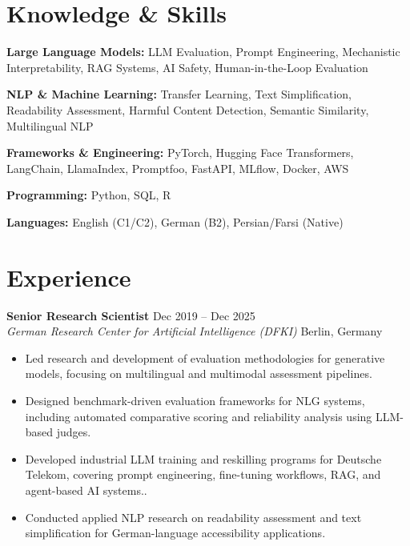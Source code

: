 \documentclass[11pt,a4paper]{article}
\newcommand{\cvitem}[1]{
    \item #1
}
\newcommand{\role}[4]{
    \textbf{#1} \hfill {\small #2} \\
    \textit{#3} \hfill {\small #4}
}
\begin{document}
\vspace{0.7em}

\section*{Knowledge \& Skills}

\textbf{Large Language Models:} 
LLM Evaluation, Prompt Engineering, Mechanistic Interpretability, RAG Systems, AI Safety, Human-in-the-Loop Evaluation

\textbf{NLP \& Machine Learning:} 
Transfer Learning, Text Simplification, Readability Assessment, Harmful Content Detection, Semantic Similarity, Multilingual NLP

\textbf{Frameworks \& Engineering:} 
PyTorch, Hugging Face Transformers, LangChain, LlamaIndex, Promptfoo, FastAPI, MLflow, Docker, AWS

\textbf{Programming:} 
Python, SQL, R

\textbf{Languages:} 
English (C1/C2), German (B2), Persian/Farsi (Native)

\vspace{0.7em}

\section*{Experience}

\role
{Senior Research Scientist}
{Dec 2019 -- Dec 2025}
{German Research Center for Artificial Intelligence (DFKI)}
{Berlin, Germany}

\begin{itemize}
    \cvitem{Led research and development of evaluation methodologies for generative models, focusing on multilingual and multimodal assessment pipelines.}

    \cvitem{Designed benchmark-driven evaluation frameworks for NLG systems, including automated comparative scoring and reliability analysis using LLM-based judges.}

    \cvitem{Developed industrial LLM training and reskilling programs for Deutsche Telekom, covering prompt engineering, fine-tuning workflows, RAG, and agent-based AI systems..}

    \cvitem{Conducted applied NLP research on readability assessment and text simplification for German-language accessibility applications.}
\end{itemize}
\end{document}
